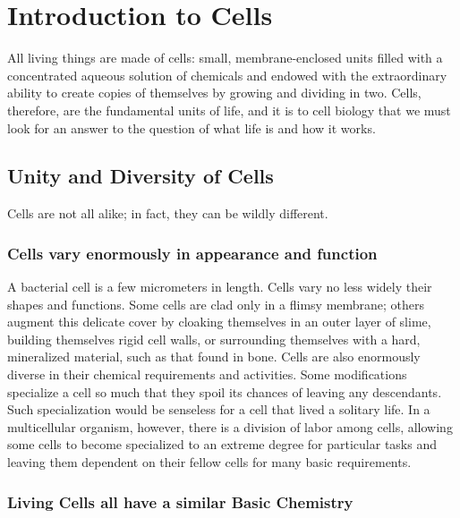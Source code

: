 \chapter{Introduction to Cells}

All living things are made of cells: small, membrane-enclosed units
filled with a concentrated aqueous solution of chemicals and endowed
with the extraordinary ability to create copies of themselves by growing
and dividing in two.
Cells, therefore, are the fundamental units of life, and it is to cell biology
that we must look for an answer to the question of what life is and how it
works.

\section{Unity and Diversity of Cells}

Cells are not all alike; in fact, they can be wildly different.

\subsection{Cells vary enormously in appearance and function}

A bacterial cell is a few micrometers in length. Cells vary no less widely
their shapes and functions.
Some cells are clad only in a flimsy membrane; others augment this delicate
cover by cloaking themselves in an outer layer of slime, building
themselves rigid cell walls, or surrounding themselves with a hard, mineralized
material, such as that found in bone.
Cells are also enormously diverse in their chemical requirements and
activities.
Some modifications specialize a cell so much that they spoil its chances
of leaving any descendants. Such specialization would be senseless for a
cell that lived a solitary life. In a multicellular organism, however, there is
a division of labor among cells, allowing some cells to become specialized
to an extreme degree for particular tasks and leaving them dependent on
their fellow cells for many basic requirements.

\subsection{Living Cells all have a similar Basic Chemistry}

